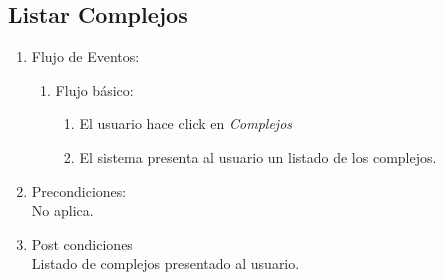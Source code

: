 \documentclass[a4paper,11pt]{article}
\begin{document}
\subsection{Listar Complejos}
\begin{enumerate}

    \begin{enumerate}
    \item Descripción breve: \\
        Se le presenta al usuario un listado de las complejos deportivos cargados en el sistema.
    \item Actores \\
        Usuario genérico.
    \item Disparadores: \\
        El usuario hace click en \emph{Complejos}.
    \end{enumerate}

    \item Flujo de Eventos: 

    \begin{enumerate}
        \item Flujo básico:
        \begin{enumerate}
            \item El usuario hace click en \emph{Complejos}
            \item El sistema presenta al usuario un listado de los complejos.
        \end{enumerate}
    \end{enumerate}

    \item Precondiciones: \\
        No aplica.

    \item Post condiciones \\
        Listado de complejos presentado al usuario.

\end{enumerate}

\end{document}
